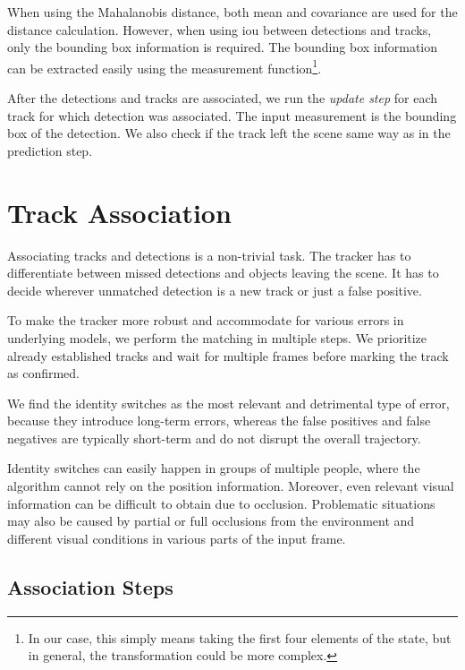 When using the Mahalanobis distance, both mean and covariance are used for the distance calculation. However, when using \gls{iou} between detections and tracks, only the bounding box information is required. The bounding box information can be extracted easily using the measurement function\footnote{In our case, this simply means taking the first four elements of the state, but in general, the transformation could be more complex.}.

After the detections and tracks are associated, we run the \textit{update step} for each track for which detection was associated. The input measurement is the bounding box of the detection. We also check if the track left the scene same way as in the prediction step.

\section{Track Association}
Associating tracks and detections is a non-trivial task. The tracker has to differentiate between missed detections and objects leaving the scene. It has to decide wherever unmatched detection is a new track or just a false positive.

To make the tracker more robust and accommodate for various errors in underlying models, we perform the matching in multiple steps. We prioritize already established tracks and wait for multiple frames before marking the track as confirmed.

We find the identity switches as the most relevant and detrimental type of error, because they introduce long-term errors, whereas the false positives and false negatives are typically short-term and do not disrupt the overall trajectory. 

Identity switches can easily happen in groups of multiple people, where the algorithm cannot rely on the position information. Moreover, even relevant visual information can be difficult to obtain due to occlusion. Problematic situations may also be caused by partial or full occlusions from the environment and different visual conditions in various parts of the input frame.

\subsection{Association Steps}

